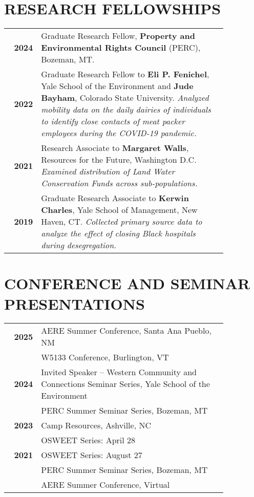 \documentclass[11pt]{article}
\begin{document}
\section*{RESEARCH FELLOWSHIPS}
\begin{longtable}{>{\bfseries}r p{0.85\linewidth}} %
2024 & Graduate Research Fellow, \textbf{Property and Environmental Rights Council} (PERC), Bozeman, MT. \\
2022 & Graduate Research Fellow to \textbf{Eli P. Fenichel}, Yale School of the Environment and \textbf{Jude Bayham}, Colorado State University. \textit{Analyzed mobility data on the daily dairies of individuals to identify close contacts of meat packer employees during the COVID-19 pandemic.} \\
2021 & Research Associate to \textbf{Margaret Walls}, Resources for the Future, Washington D.C. \textit{Examined distribution of Land Water Conservation Funds across sub-populations.}\\
2019 & Graduate Research Associate to \textbf{Kerwin Charles}, Yale School of Management, New Haven, CT. \textit{Collected primary source data to analyze the effect of closing Black hospitals during desegregation.} \\
\end{longtable}

\section*{CONFERENCE AND SEMINAR PRESENTATIONS}
\begin{longtable}{>{\bfseries}r p{0.85\linewidth}} %
2025 & AERE Summer Conference, Santa Ana Pueblo, NM \\ 
    & W5133 Conference, Burlington, VT \\ 
2024 & Invited Speaker -- Western Community and Connections Seminar Series, Yale School of the Environment \\
    & PERC Summer Seminar Series, Bozeman, MT \\
2023 & Camp Resources, Ashville, NC \\
    & OSWEET Series: April 28 \\
2021 & OSWEET Series: August 27 \\
    & PERC Summer Seminar Series, Bozeman, MT \\
    & AERE Summer Conference, Virtual
\end{longtable}
\end{document}
